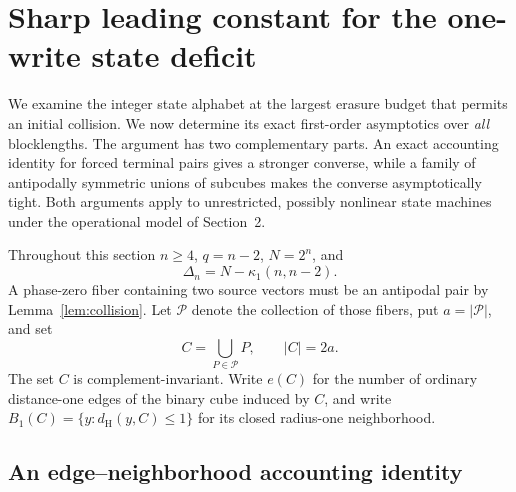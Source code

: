 \documentclass[11pt,a4paper]{article}
\begin{document}
\section{Sharp leading constant for the one-write state deficit}\label{sec:v4sharp}

We examine the integer state alphabet at the largest erasure budget that permits an initial collision. We now determine its exact first-order asymptotics over \emph{all} blocklengths. The argument has two complementary parts. An exact accounting identity for forced terminal pairs gives a stronger converse, while a family of antipodally symmetric unions of subcubes makes the converse asymptotically tight. Both arguments apply to unrestricted, possibly nonlinear state machines under the operational model of Section~2.

Throughout this section $n\ge4$, $q=n-2$, $N=2^n$, and
\[
 \Delta_n=N-\kappa_1(n,n-2).
\]
A phase-zero fiber containing two source vectors must be an antipodal pair by Lemma~\ref{lem:collision}. Let $\mathcal P$ denote the collection of those fibers, put $a=|\mathcal P|$, and set
\[
 C=\bigcup_{P\in\mathcal P}P,\qquad |C|=2a.
\]
The set $C$ is complement-invariant. Write $e(C)$ for the number of ordinary distance-one edges of the binary cube induced by $C$, and write $B_1(C)=\{y:d_{\mathrm H}(y,C)\le1\}$ for its closed radius-one neighborhood.

\subsection{An edge--neighborhood accounting identity}
\end{document}
